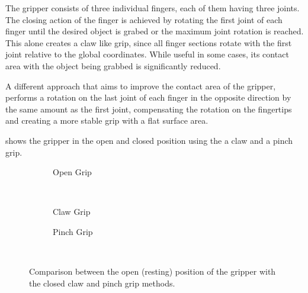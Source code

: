 The gripper consists of three individual fingers, each of them having three joints. The closing action of the finger is achieved by rotating the first joint of each finger until the desired object is grabed or the maximum joint rotation is reached. This alone creates a claw like grip, since all finger sections rotate with the first joint relative to the global coordinates. While useful in some cases, its contact area with the object being grabbed is significantly reduced.

A different approach that aims to improve the contact area of the gripper, performs a rotation on the last joint of each finger in the opposite direction by the same amount as the first joint, compensating the rotation on the fingertips and creating a more stable grip with a flat surface area.

 shows the gripper in the open and closed position using the a claw and a pinch grip.


\begin{figure}[!h]
    \centering
    \begin{subfigure}[b]{0.5\textwidth}
        \caption{Open Grip}
    \end{subfigure}\\\vspace{0.5cm}
    
    \begin{subfigure}[b]{0.4\textwidth}
        \caption{Claw Grip}
    \end{subfigure}
    \hfill
    \begin{subfigure}[b]{0.4\textwidth}
        \caption{Pinch Grip}
    \end{subfigure}\\\vspace{0.5cm}

    \caption{Comparison between the open (resting) position of the gripper with the closed claw and pinch grip methods.}
    \label{fig:grip_states}
\end{figure}

